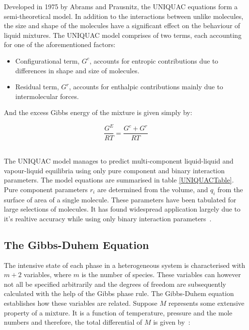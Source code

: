 Developed in 1975 by Abrams and Prausnitz, the UNIQUAC equations form a semi-theoretical model. In addition to the interactions between unlike molecules, the size and shape of the molecules have a significant effect on the behaviour of liquid mixtures. The UNIQUAC model comprises of two terms, each accounting for one of the aforementioned factors:~\cite{Dechema, ThermophysicalProperties, MolecularThermodynamicsOfFluidPhaseEquilibria, ThermodynamicModels, ActivityCoefficientModelApplicationUNI, UNIQUAC}\
\begin{itemize}
\item Configurational term, $G^{c}$, accounts for entropic contributions due to differences in shape and size of molecules.\
\item Residual term, $G^{r}$, accounts for enthalpic contributions mainly due to intermolecular forces.\
\end{itemize}

And the excess Gibbs energy of the mixture is given simply by:\

\begin{equation}
\dfrac{G^{E}}{RT} = \dfrac{G^{c}+G^{r}}{RT}
\end{equation}\

The UNIQUAC model manages to predict multi-component liquid-liquid and vapour-liquid equilibria using only pure component and binary interaction parameters. The model equations are summarised in table \ref{UNIQUACTable}. Pure component parameters $r_{i}$ are determined from the volume, and $q_{i}$ from the surface of area of a single molecule. These parameters have been tabulated for large selections of molecules. It has found widespread application largely due to it's realtive accuracy while using only binary interaction parameters~\cite{Dechema, ThermophysicalProperties, MolecularThermodynamicsOfFluidPhaseEquilibria, ActivityCoefficientModelApplicationUNI, StabilityAnalysis, ReliableComputationBinaryParams}.\

\subsection{The Gibbs-Duhem Equation}

The intensive state of each phase in a heterogeneous system is characterised with $m+2$ variables, where $m$ is the number of species. These variables can however not all be specified arbitrarily and the degrees of freedom are subsequently calculated with the help of the Gibbs phase rule. The Gibbs-Duhem equation establishes how these variables are related. Suppose $M$ represents some extensive property of a mixture. It is a function of temperature, pressure and the mole numbers and therefore, the total differential of $M$ is given by~\cite{MolecularThermodynamicsOfFluidPhaseEquilibria}:\

